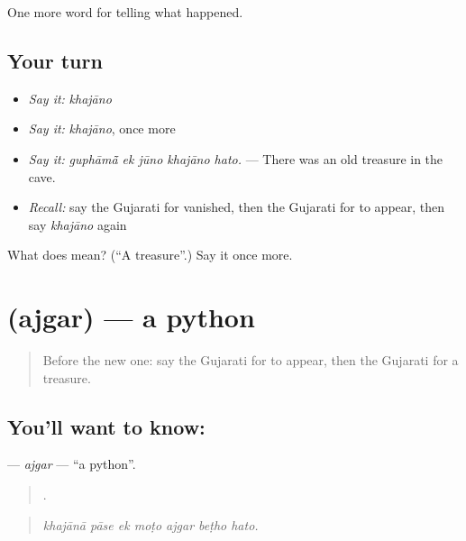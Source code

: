 \begin{grammarlens}[title={What you've built}]
One more word for telling what happened.
\end{grammarlens}

\subsection*{Your turn}
\begin{itemize}
\raggedright
  \item \emph{Say it:} \emph{khajāno}
  \item \emph{Say it:} \emph{khajāno}, once more
  \item \emph{Say it:} \emph{guphāmā̃ ek jūno khajāno hato.} — There was an old treasure in the cave.
  \item \emph{Recall:} say the Gujarati for vanished, then the Gujarati for to appear, then say \emph{khajāno} again
\end{itemize}

\begin{tcolorbox}[breakable,colback=teal!4,colframe=teal!35!black,title={Before you move on}]
What does  mean? (\textquotedblleft{}A treasure\textquotedblright{}.) Say it once more.
\end{tcolorbox}
\section[\texorpdfstring{\gu{અજગર} (ajgar)}{અજગર (ajgar)}]{ (ajgar) — a python}

\label{lesson:GU-C334-ajgar}



\begin{quote}
Before the new one: say the Gujarati for to appear, then the Gujarati for a treasure.
\end{quote}

\subsection*{You'll want to know: }
\textbf{} — \emph{ajgar} — \textquotedblleft{}a python\textquotedblright{}.

\begin{quote}
      .
\end{quote}

\begin{quote}
\emph{khajānā pāse ek moṭo ajgar beṭho hato.}
\end{quote}

